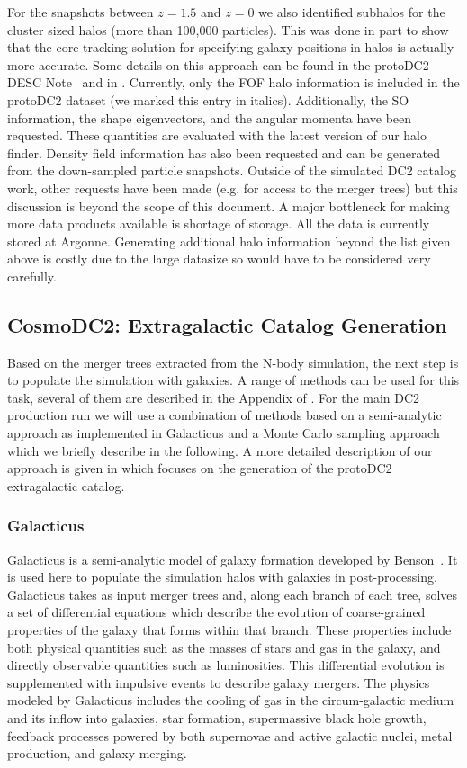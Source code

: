 \documentclass[preprint,times]{aastex61}
\begin{document}
For the snapshots between $z=1.5$ and $z=0$ we also identified subhalos for the cluster sized halos (more than 100,000 particles). This was done in part to show that the core tracking solution for specifying galaxy positions in halos is actually more accurate. Some details on this approach can be found in the protoDC2 DESC Note~\citep{protoDC2} and in \cite{korytov}. Currently, only the FOF halo information is included in the protoDC2 dataset (we marked this entry in italics). Additionally, the SO information, the shape eigenvectors, and the angular momenta have been requested. These quantities are evaluated with the latest version of our halo finder. Density field information has also been requested and can be generated from the down-sampled particle snapshots. Outside of the simulated DC2 catalog work, other requests have been made (e.g. for access to the merger trees) but this discussion is beyond the scope of this document. A major bottleneck for making more data products available is shortage of storage. All the data is currently stored at Argonne. Generating additional halo information beyond the list given above is costly due to the large datasize so would have to be considered very carefully. 

\subsection{CosmoDC2: Extragalactic Catalog Generation}
\label{sec:mocks}
Based on the merger trees extracted from the N-body simulation, the next step is to populate the simulation with galaxies. A range of methods can be used for this task, several of them are described in the Appendix of \cite{descqa}. For the main DC2 production run we will use a combination of methods based on a semi-analytic approach as implemented in Galacticus and a Monte Carlo sampling approach which we briefly describe in the following.
A more detailed description of our approach is given in \cite{protoDC2} which focuses on the generation of the protoDC2 extragalactic catalog.

\subsubsection{Galacticus}

Galacticus is a semi-analytic model of galaxy formation developed by Benson~\cite{benson}. It is used here to populate the simulation halos with galaxies in post-processing. Galacticus takes as input merger trees and, along each branch of each tree, solves a set of differential equations which describe the evolution of coarse-grained properties of the galaxy that forms within that branch. These properties include both physical quantities such as the masses of stars and gas in the galaxy, and directly observable quantities such as luminosities. This differential evolution is supplemented with impulsive events to describe galaxy mergers. The physics modeled by Galacticus includes the cooling of gas in the circum-galactic medium and its inflow into galaxies, star formation, supermassive black hole growth, feedback processes powered by both supernovae and active galactic nuclei, metal production, and galaxy merging. 
\end{document}

